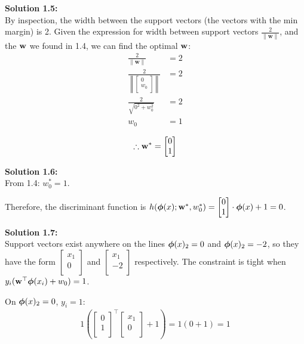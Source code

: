 \documentclass[submit]{harvardml}
\begin{document}
\noindent\textbf{Solution 1.5:}\\
By inspection, the width between the support vectors (the vectors with the min margin) is 2. Given the expression for width between support vectors $\frac{2}{\|\mathbf{w}\|}$, and the $\mathbf{w}$ we found in 1.4, we can find the optimal $\mathbf{w}$:
\begin{align*}
    \frac{2}{\|\mathbf{w}\|} &= 2\\
    \frac{2}{\left\|\begin{bmatrix} 0\\ w_0 \\ \end{bmatrix}\right\|} &= 2\\
    \frac{2}{\sqrt{0^2 + w_0^2}} &= 2\\
    w_0 &= 1\\
\end{align*}
\begin{align*}
    \therefore \mathbf{w}^* = \begin{bmatrix} 0\\ 1 \\ \end{bmatrix}
\end{align*}

\noindent\textbf{Solution 1.6:}\\
From 1.4: $w_0^* = 1$.

Therefore, the discriminant function is $h(\boldsymbol{\phi}(x);\mathbf{w}^*,w_0^*) = \begin{bmatrix} 0\\ 1 \\ \end{bmatrix} \cdot \boldsymbol{\phi}(x) + 1 = 0$.

\noindent\textbf{Solution 1.7:}\\
Support vectors exist anywhere on the lines $\boldsymbol{\phi}(x)_2 = 0$ and $\boldsymbol{\phi}(x)_2 = -2$, so they have the form $\begin{bmatrix} x_1\\ 0\\ \end{bmatrix}$ and $\begin{bmatrix} x_1\\ -2\\ \end{bmatrix}$ respectively. The constraint is tight when $y_i(\mathbf{w}^\top \boldsymbol{\phi}(x_i) + w_0) = 1$.

On $\boldsymbol{\phi}(x)_2 = 0$, $y_i = 1$:
\begin{align*}
    1\left(\begin{bmatrix} 0\\ 1\\ \end{bmatrix}^\top \begin{bmatrix} x_1\\ 0\\ \end{bmatrix} + 1\right) = 1(0+1) = 1
\end{align*}
\end{document}
